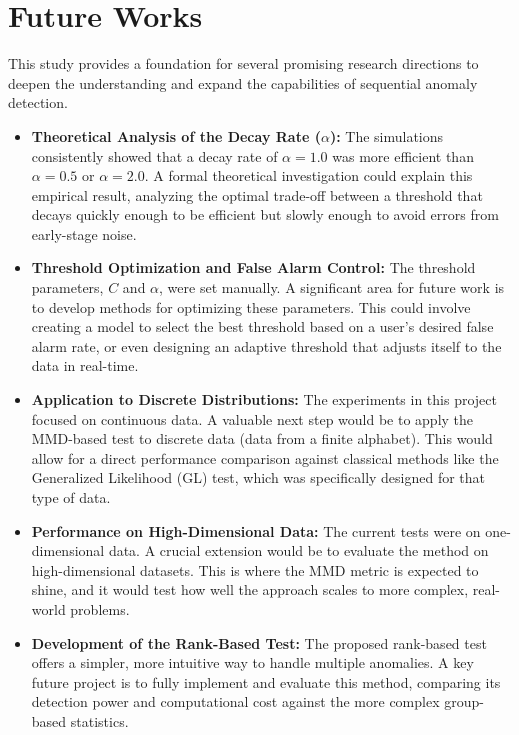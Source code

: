 \chapter{Future Works}
This study provides a foundation for several promising research directions to deepen the understanding and expand the capabilities of sequential anomaly detection.

\begin{itemize}
    \item \textbf{Theoretical Analysis of the Decay Rate ($\alpha$):} The simulations consistently showed that a decay rate of $\alpha=1.0$ was more efficient than $\alpha=0.5$ or $\alpha=2.0$. A formal theoretical investigation could explain this empirical result, analyzing the optimal trade-off between a threshold that decays quickly enough to be efficient but slowly enough to avoid errors from early-stage noise.

    \item \textbf{Threshold Optimization and False Alarm Control:} The threshold parameters, $C$ and $\alpha$, were set manually. A significant area for future work is to develop methods for optimizing these parameters. This could involve creating a model to select the best threshold based on a user's desired false alarm rate, or even designing an adaptive threshold that adjusts itself to the data in real-time.

    \item \textbf{Application to Discrete Distributions:} The experiments in this project focused on continuous data. A valuable next step would be to apply the MMD-based test to discrete data (data from a finite alphabet). This would allow for a direct performance comparison against classical methods like the Generalized Likelihood (GL) test, which was specifically designed for that type of data.

    \item \textbf{Performance on High-Dimensional Data:} The current tests were on one-dimensional data. A crucial extension would be to evaluate the method on high-dimensional datasets. This is where the MMD metric is expected to shine, and it would test how well the approach scales to more complex, real-world problems.

    \item \textbf{Development of the Rank-Based Test:} The proposed rank-based test offers a simpler, more intuitive way to handle multiple anomalies. A key future project is to fully implement and evaluate this method, comparing its detection power and computational cost against the more complex group-based statistics.


\end{itemize}
